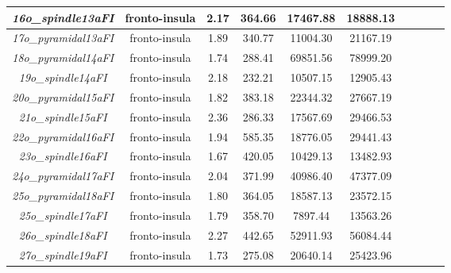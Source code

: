 \begin{longtable}{|c|c|c|c|c|c|c|c|c|c|}
	\textit{16o\_spindle13aFI}    & fronto-insula      & 2.17                      & 364.66                    & 17467.88                  & 18888.13                  \\ \hline
	\textit{17o\_pyramidal13aFI}  & fronto-insula      & 1.89                      & 340.77                    & 11004.30                  & 21167.19                  \\ \hline
	\textit{18o\_pyramidal14aFI}  & fronto-insula      & 1.74                      & 288.41                    & 69851.56                  & 78999.20                  \\ \hline
	\textit{19o\_spindle14aFI}    & fronto-insula      & 2.18                      & 232.21                    & 10507.15                  & 12905.43                  \\ \hline
	\textit{20o\_pyramidal15aFI}  & fronto-insula      & 1.82                      & 383.18                    & 22344.32                  & 27667.19                  \\ \hline
	\textit{21o\_spindle15aFI}    & fronto-insula      & 2.36                      & 286.33                    & 17567.69                  & 29466.53                  \\ \hline
	\textit{22o\_pyramidal16aFI}  & fronto-insula      & 1.94                      & 585.35                    & 18776.05                  & 29441.43                  \\ \hline
	\textit{23o\_spindle16aFI}    & fronto-insula      & 1.67                      & 420.05                    & 10429.13                  & 13482.93                  \\ \hline
	\textit{24o\_pyramidal17aFI}  & fronto-insula      & 2.04                      & 371.99                    & 40986.40                  & 47377.09                  \\ \hline
	\textit{25o\_pyramidal18aFI}  & fronto-insula      & 1.80                      & 364.05                    & 18587.13                  & 23572.15                  \\ \hline
	\textit{25o\_spindle17aFI}    & fronto-insula      & 1.79                      & 358.70                    & 7897.44                   & 13563.26                  \\ \hline
	\textit{26o\_spindle18aFI}    & fronto-insula      & 2.27                      & 442.65                    & 52911.93                  & 56084.44                  \\ \hline
	\textit{27o\_spindle19aFI}    & fronto-insula      & 1.73                      & 275.08                    & 20640.14                  & 25423.96                  \\ \hline

\end{longtable}
